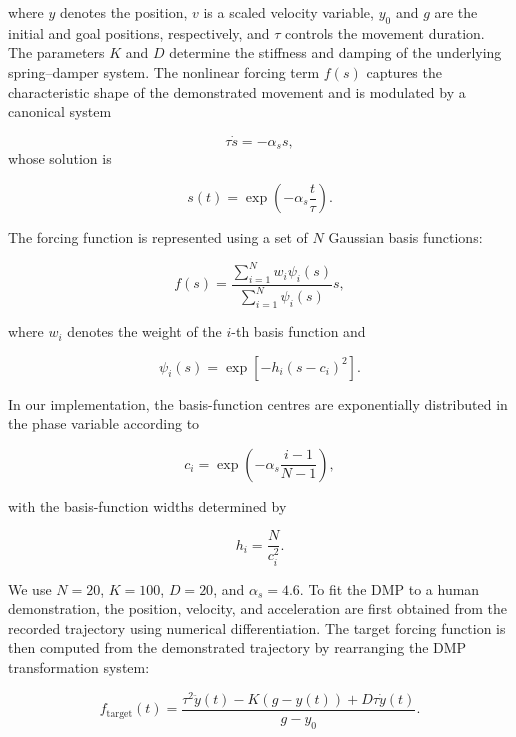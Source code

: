 \documentclass[journal]{IEEEtran}
\begin{document}
where $y$ denotes the position, $v$ is a scaled velocity variable, $y_0$ and $g$ are the initial and goal positions, respectively, and $\tau$ controls the movement duration. The parameters $K$ and $D$ determine the stiffness and damping of the underlying spring--damper system. The nonlinear forcing term $f(s)$ captures the characteristic shape of the demonstrated movement and is modulated by a canonical system

\begin{equation}
\tau \dot{s}=-\alpha_s s,
\end{equation}
whose solution is

\begin{equation}
s(t)=\exp\left(-\alpha_s\frac{t}{\tau}\right).
\end{equation}

The forcing function is represented using a set of $N$ Gaussian basis functions:

\begin{equation}
f(s)=\frac{\sum_{i=1}^{N}w_i\psi_i(s)}{\sum_{i=1}^{N}\psi_i(s)}s,
\end{equation}

where $w_i$ denotes the weight of the $i$-th basis function and

\begin{equation}
\psi_i(s)=\exp\left[-h_i(s-c_i)^2\right].
\end{equation}

In our implementation, the basis-function centres are exponentially distributed in the phase variable according to

\begin{equation}
c_i=\exp\left(-\alpha_s\frac{i-1}{N-1}\right),
\end{equation}

with the basis-function widths determined by

\begin{equation}
h_i=\frac{N}{c_i^2}.
\end{equation}

We use $N=20$, $K=100$, $D=20$, and $\alpha_s=4.6$. To fit the DMP to a human demonstration, the position, velocity, and acceleration are first obtained from the recorded trajectory using numerical differentiation. The target forcing function is then computed from the demonstrated trajectory by rearranging the DMP transformation system:

\begin{equation}
f_{\mathrm{target}}(t)=\frac{\tau^2\ddot{y}(t)-K(g-y(t))+D\tau\dot{y}(t)}{g-y_0}.
\end{equation}
\end{document}
